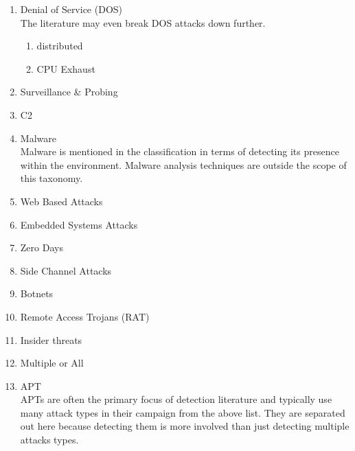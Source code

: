 \documentclass[conference]{IEEEtran}
\begin{document}
\begin{enumerate}
    \item Denial of Service (DOS) \cite{zargar2013survey}\cite{warrender1999detecting}\cite{lee1999data}
    \\The literature may even break DOS attacks down further.
    \begin{enumerate} 
        \item distributed
        \item CPU Exhaust
    \end{enumerate}
    \item Surveillance \& Probing \cite{lazarevic2005intrusion}
    \item C2 \cite{chen2014study}\cite{jasek2013apt}\cite{bhatt2014towards}
    \item Malware\cite{gabriel2009analyzing}\cite{tankard2011advanced}
    \\Malware is mentioned in the classification in terms of detecting its presence within the environment. Malware analysis techniques are outside the scope of this taxonomy.
    \item Web Based Attacks
    \item Embedded Systems Attacks
    \item Zero Days\cite{kotenko2012common}\cite{chen2014study}\cite{jeun2012practical}
    \item Side Channel Attacks
    \item Botnets\cite{singh2014big}\cite{awad2017network}
    \item Remote Access Trojans (RAT)\cite{wu2017detecting}
    \item Insider threats\cite{mukherjee1994network}
    \item Multiple or All
    \item APT\cite{jasek2013apt}\cite{saud2015towards}\cite{kim2013detection}
    \\APTs are often the primary focus of detection literature and typically use many attack types in their campaign from the above list. They are separated out here because detecting them is more involved than just detecting multiple attacks types.

\end{enumerate}
\end{document}
